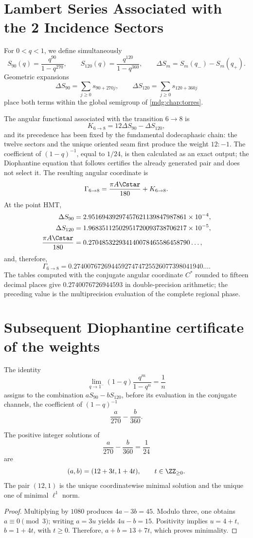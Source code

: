 \section{Lambert Series Associated with the 2 Incidence Sectors}

For \(0<q<1\), we define simultaneously
\[
 S_{90}(q)=\frac{q^{90}}{1-q^{270}},
 \qquad
 S_{120}(q)=\frac{q^{120}}{1-q^{360}},
 \qquad
 \Delta S_m=S_m(q_-)-S_m(q_+).
\]
Geometric expansions
\[
 \Delta S_{90}=\sum_{j\geq0}s_{90+270j},
 \qquad
 \Delta S_{120}=\sum_{j\geq0}s_{120+360j}
\]
place both terms within the global semigroup of
\cref{mdg:chap:torres}.

The angular functional associated with the transition \(6\to8\) is
\[
 K_{6\to8}=12\Delta S_{90}-\Delta S_{120},
\]
and its precedence has been fixed by the fundamental dodecaphasic chain:
the twelve sectors and the unique oriented seam first produce the weight
\(12:-1\). The coefficient of \((1-q)^{-1}\), equal to \(1/24\), is then calculated as an exact output;
the Diophantine equation that follows certifies the already generated pair and does not
select it.
The resulting angular coordinate is
\[
\Gamma_{6\to8}
=\frac{\pi A\Cstar}{180}+K_{6\to8}.
\]
At the point HMT,
\[
\begin{aligned}
 \Delta S_{90}&=2.95169439297457621139847987861\times10^{-4},\\
 \Delta S_{120}&=1.96835112502951720093738706217\times10^{-5},\\
 \frac{\pi A\Cstar}{180}&=0.270485322934140078465586458790\ldots,
\end{aligned}
\]
and, therefore,
\[
 \boxed{\Gamma_{6\to8}
 =0.27400767269445927474725526077398041940\ldots.}
\]
The tables computed with the conjugate angular coordinate \(C^*\) rounded to fifteen decimal places give
\(0.2740076726944593\) in double-precision arithmetic; the preceding value
is the multiprecision evaluation of the complete regional phase.

\section{Subsequent Diophantine certificate of the weights}

The identity
\[
 \lim_{q\to1^-}(1-q)\frac{q^m}{1-q^n}=\frac1n
\]
assigns to the combination \(aS_{90}-bS_{120}\), before its evaluation
in the conjugate channels, the coefficient of \((1-q)^{-1}\)
\[
 \frac a{270}-\frac b{360}.
\]

\begin{theorem}
The positive integer solutions of
\[
 \frac a{270}-\frac b{360}=\frac1{24}
\]
are
\[
 (a,b)=(12+3t,1+4t),\qquad t\in\ZZ_{\geq0}.
\]
The pair \((12,1)\) is the unique coordinatewise minimal solution and the
unique one of minimal \(\ell^1\) norm.
\end{theorem}
\begin{proof}
Multiplying by \(1080\) produces \(4a-3b=45\). Modulo three, one obtains
\(a\equiv0\pmod3\); writing \(a=3u\) yields \(4u-b=15\).
Positivity implies \(u=4+t\), \(b=1+4t\), with \(t\geq0\). Therefore,
\(a+b=13+7t\), which proves minimality.
\end{proof}

